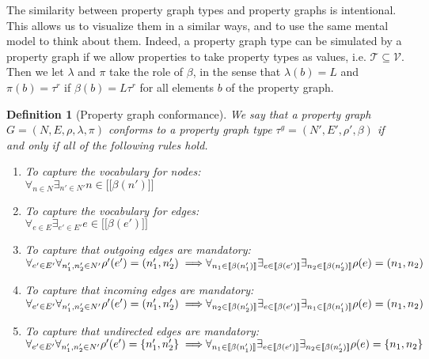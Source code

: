 \documentclass[a4paper]{article}
\newtheorem{definition}[theorem]{Definition}
\newcommand{\ptypes}{\mathcal{T}}
\newcommand{\rtype}{\tau^r}
\newcommand{\gtype}{\tau^g}
\newcommand{\lsem}{\ensuremath{[\![}}
\newcommand{\rsem}{\ensuremath{]\!]}}
\newcommand{\sem}[1]{\ensuremath{\lsem #1 \rsem}}
\begin{document}
The similarity between property graph types and property graphs is intentional. This allows us to visualize them in a similar ways, and to use the same mental model to think about them. Indeed, a property graph type can be simulated by a property graph if we allow properties to take property types as values, i.e. $\ptypes \subseteq \mathcal{V}$. Then we let $\lambda$ and $\pi$ take the role of $\beta$, in the sense that $\lambda(b) = L$ and $\pi(b) = \rtype$ if $\beta(b) = L\rtype$ for all elements $b$ of the property graph.

\begin{definition}[Property graph conformance]
  We say that a property graph $G = (N, E, \rho, \lambda, \pi)$ \emph{conforms} to a property graph type $\gtype = (N', E', \rho', \beta)$ if and only if all of the following rules hold.

  \begin{enumerate}
    \item To capture the vocabulary for nodes:\\
    $\forall_{n \in N} \exists_{n' \in N'} n \in \sem{\beta(n')}$
    
    \item To capture the vocabulary for edges:\\
    $\forall_{e \in E} \exists_{e' \in E'} e \in \sem{\beta(e')}$
    
    \item To capture that outgoing edges are mandatory:\\
    $\forall_{e' \in E'} \forall_{n'_1, n'_2 \in N'} \rho'(e') = (n'_1, n'_2) \implies
    \\\forall_{n_1 \in \sem{\beta(n'_1)}} \exists_{e \in \sem{\beta(e')}} \exists_{n_2 \in \sem{\beta(n'_2)}} \rho(e) = (n_1, n_2)$


    \item To capture that incoming edges are mandatory:\\
    $\forall_{e' \in E'} \forall_{n'_1, n'_2 \in N'} \rho'(e') = (n'_1, n'_2) \implies
    \\\forall_{n_2 \in \sem{\beta(n'_2)}} \exists_{e \in \sem{\beta(e')}} \exists_{n_1 \in \sem{\beta(n'_1)}} \rho(e) = (n_1, n_2)$
    
    \item To capture that undirected edges are mandatory:\\
    $\forall_{e' \in E'} \forall_{n'_1, n'_2 \in N'} \rho'(e') = \{n'_1, n'_2\} \implies
    \\\forall_{n_1 \in \sem{\beta(n'_1)}} \exists_{e \in \sem{\beta(e')}} \exists_{n_2 \in \sem{\beta(n'_2)}} \rho(e) = \{n_1, n_2\}$
  \end{enumerate}
\end{definition}
\end{document}
